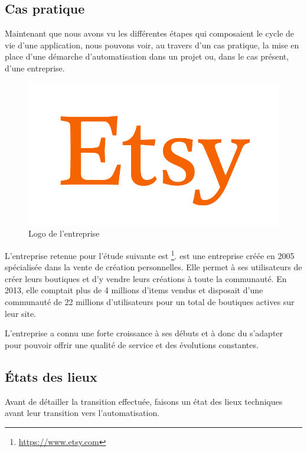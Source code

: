 \subsection{Cas pratique}

Maintenant que nous avons vu les différentes étapes qui composaient le cycle de vie d'une application, nous pouvons voir, au travers d'un cas pratique, la mise en place d'une démarche d'automatisation dans un projet ou, dans le cas présent, d'une entreprise.

\begin{figure}
	\includegraphics[scale=0.125]{img/etsy.png}
	\caption{Logo de l'entreprise \etsy}\label{fig:etsy}
\end{figure}

L'entreprise retenue pour l'étude suivante est \etsy\footnote{\url{https://www.etsy.com}}. \etsy{} est une entreprise créée en 2005 spécialisée dans la vente de création personnelles. Elle permet à ses utilisateurs de créer leurs boutiques et d'y vendre leurs créations à toute la communauté. En 2013, elle comptait plus de 4 millions d'items vendus et disposait d'une communauté de 22 millions d'utilisateurs pour un total de  boutiques actives sur leur site.

L'entreprise a connu une forte croissance à ses débuts et à donc du s'adapter pour pouvoir offrir une qualité de service et des évolutions constantes.

\subsection{États des lieux}

Avant de détailler la transition effectuée, faisons un état des lieux techniques avant leur transition vers l'automatisation.

